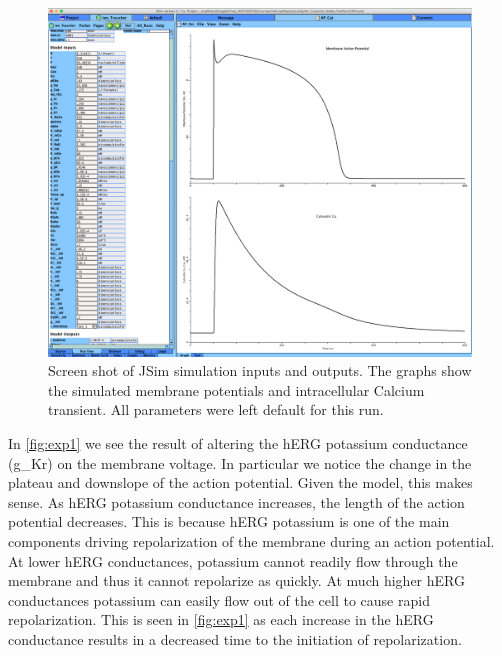 \documentclass[11pt]{article}
\begin{document}
\begin{figure}[H]
	\centering
	\centering
	\includegraphics[width = .95\textwidth]{figs/original.png}
	
	\caption{Screen shot of JSim simulation inputs and outputs. The graphs show the simulated membrane potentials and intracellular Calcium transient. All parameters were left default for this run. }
	\label{fig:original}
\end{figure}
\par{}

In \ref{fig:exp1} we see the result of altering the hERG potassium conductance (g\_Kr) on the membrane voltage. In particular we notice the change in the plateau and downslope of the action potential. Given the model, this makes sense. As hERG potassium conductance increases, the length of the action potential decreases. This is because hERG potassium is one of the main components driving repolarization of the membrane during an action potential. At lower hERG conductances, potassium cannot readily flow through the membrane and thus it cannot repolarize as quickly. At much higher hERG conductances potassium can easily flow out of the cell to cause rapid repolarization. This is seen in \ref{fig:exp1} as each increase in the hERG conductance results in a decreased time to the initiation of repolarization.
\end{document}

